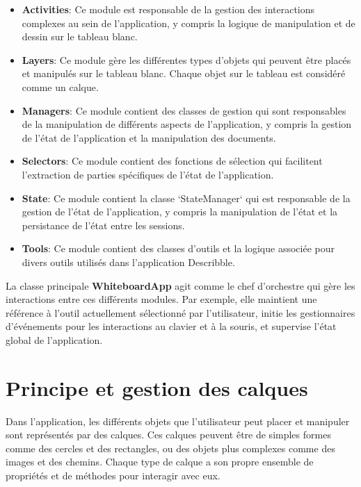 \begin{itemize}
    \item \textbf{Activities}: Ce module est responsable de la gestion des interactions complexes au sein de l'application, y compris la logique de manipulation et de dessin sur le tableau blanc.

    \item \textbf{Layers}: Ce module gère les différentes types d'objets qui peuvent être placés et manipulés sur le tableau blanc. Chaque objet sur le tableau est considéré comme un calque.

    \item \textbf{Managers}: Ce module contient des classes de gestion qui sont responsables de la manipulation de différents aspects de l'application, y compris la gestion de l'état de l'application et la manipulation des documents.

    \item \textbf{Selectors}: Ce module contient des fonctions de sélection qui facilitent l'extraction de parties spécifiques de l'état de l'application.

    \item \textbf{State}: Ce module contient la classe `StateManager` qui est responsable de la gestion de l'état de l'application, y compris la manipulation de l'état et la persistance de l'état entre les sessions.

    \item \textbf{Tools}: Ce module contient des classes d'outils et la logique associée pour divers outils utilisés dans l'application Describble.
\end{itemize}

La classe principale \textbf{WhiteboardApp}  agit comme le chef d'orchestre qui gère les interactions entre ces différents modules. Par exemple, elle maintient une référence à l'outil actuellement sélectionné par l'utilisateur, initie les gestionnaires d'événements pour les interactions au clavier et à la souris, et supervise l'état global de l'application.

\section{Principe et gestion des calques}

Dans l'application, les différents objets que l'utilisateur peut placer et manipuler sont représentés par des calques. Ces calques peuvent être de simples formes comme des cercles et des rectangles, ou des objets plus complexes comme des images et des chemins. Chaque type de calque a son propre ensemble de propriétés et de méthodes pour interagir avec eux.

